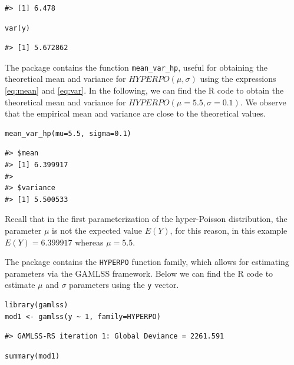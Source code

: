 \begin{verbatim}
#> [1] 6.478
\end{verbatim}

\begin{verbatim}
var(y)
\end{verbatim}

\begin{verbatim}
#> [1] 5.672862
\end{verbatim}

The  package contains the function \texttt{mean\_var\_hp}, useful for obtaining the theoretical mean and variance for \(HYPERPO(\mu, \sigma)\) using the expressions \eqref{eq:mean} and \eqref{eq:var}. In the following, we can find the R code to obtain the theoretical mean and variance for \(HYPERPO(\mu=5.5, \sigma=0.1)\). We observe that the empirical mean and variance are close to the theoretical values.

\begin{verbatim}
mean_var_hp(mu=5.5, sigma=0.1)
\end{verbatim}

\begin{verbatim}
#> $mean
#> [1] 6.399917
#> 
#> $variance
#> [1] 5.500533
\end{verbatim}

Recall that in the first parameterization of the hyper-Poisson distribution, the parameter \(\mu\) is not the expected value \(E(Y)\), for this reason, in this example \(E(Y)=6.399917\) whereas \(\mu=5.5\).

The  package contains the \texttt{HYPERPO} function family, which allows for estimating parameters via the GAMLSS framework. Below we can find the R code to estimate \(\mu\) and \(\sigma\) parameters using the \texttt{y} vector.

\begin{verbatim}
library(gamlss)
mod1 <- gamlss(y ~ 1, family=HYPERPO)
\end{verbatim}

\begin{verbatim}
#> GAMLSS-RS iteration 1: Global Deviance = 2261.591
\end{verbatim}

\begin{verbatim}
summary(mod1)
\end{verbatim}

